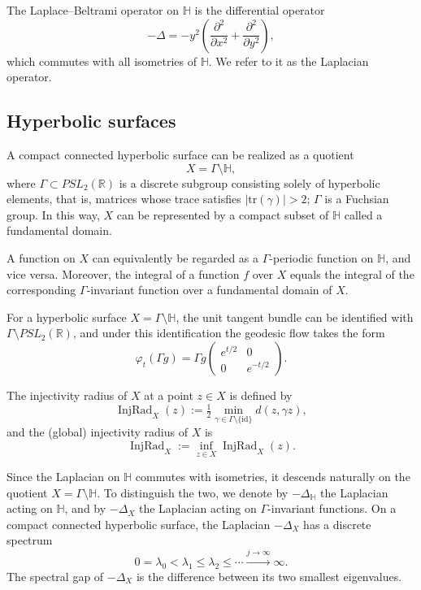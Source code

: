 \documentclass[11pt,twoside,reqno]{amsart} \usepackage{a4wide} \usepackage[T1]{fontenc} \usepackage[utf8]{inputenc} \usepackage{soul}  \usepackage{amsmath} \usepackage{amsfonts} \usepackage{amssymb} \usepackage{mathtools} \usepackage{amsthm} \usepackage{xcolor} \usepackage{graphicx} \usepackage{hyperref} \usepackage{standalone} \usepackage{esint} \usepackage{comment} \usepackage[left=2.3cm,top=3cm,right=2.3cm]{geometry} \usepackage{bm} \usepackage{svg} \usepackage{float} \numberwithin{equation}{section} \theoremstyle{plain} \newtheorem{thm}{Theorem}[section] \newtheorem{theorem}[thm]{Theorem} \newtheorem*{theorem*}{Theorem}\newtheorem{conj}[thm]{Conjecture} \newtheorem{lemma}[thm]{Lemma} \newtheorem{prop}[thm]{Proposition} \newtheorem{proposition}[thm]{Proposition} \newtheorem{cor}[thm]{Corollary} \newtheorem{question}[thm]{Question} \newtheorem{corollary}[thm]{Corollary} \newtheorem{assumption}[thm]{Assumption} \theoremstyle{definition} \newtheorem{defn}[thm]{Definition} \newtheorem{choice}[thm]{Choice} \newtheorem{definition}[thm]{Definition} \newtheorem{ex}[thm]{Example} \newtheorem{notation}[thm]{Notation} \newtheorem*{ack}{Acknowledgements} \theoremstyle{remark} \newtheorem{remark}[thm]{Remark} \newtheorem{bigremark}[thm]{Remark} \usepackage{xcolor} \newcommand{\red}[1]{ {\color{Red}#1} } \newcommand{\blue}[1]{ {\color{Blue}#1} } \author{Kai Hippi} \address{Aalto University, Espoo, Finland} \email{kai.hippi@aalto.fi}
\begin{document}
The Laplace--Beltrami operator on \( \mathbb{H} \) is the differential operator
\[
    -\Delta = -y^{2}\left( \frac{\partial^{2}}{\partial x^{2}} + \frac{\partial^{2}}{\partial y^{2}} \right),
\]
which commutes with all isometries of \( \mathbb{H} \). We refer to it as the Laplacian operator.

\subsection{Hyperbolic surfaces}

A compact connected hyperbolic surface can be realized as a quotient
\[
    X = \Gamma \setminus \mathbb{H},
\]
where \( \Gamma \subset PSL_{2}(\mathbb{R}) \) is a discrete subgroup consisting solely of hyperbolic elements, that is, matrices whose trace satisfies \( |\mathrm{tr}(\gamma)| > 2 \); $ \Gamma $ is a Fuchsian group. In this way, \( X \) can be represented by a compact subset of $ \mathbb{H} $ called a fundamental domain.

A function on \( X \) can equivalently be regarded as a \( \Gamma \)-periodic function on \( \mathbb{H} \), and vice versa. Moreover, the integral of a function \( f \) over \( X \) equals the integral of the corresponding \( \Gamma \)-invariant function over a fundamental domain of $ X $.

For a hyperbolic surface \( X = \Gamma \setminus \mathbb{H} \), the unit tangent bundle can be identified with \( \Gamma \setminus PSL_{2}(\mathbb{R}) \), and under this identification the geodesic flow takes the form
\[
    \varphi_{t}(\Gamma g) = \Gamma g
    \begin{pmatrix} e^{t/2} & 0 \\ 0 & e^{-t/2} \end{pmatrix}.
\]

The injectivity radius of \( X \) at a point \( z \in X \) is defined by
\[
    \operatorname{InjRad}_{X}(z)
    := \tfrac{1}{2} \min_{\gamma \in \Gamma \setminus \{\mathrm{id}\}} d(z, \gamma z),
\]
and the (global) injectivity radius of \( X \) is
\[
    \operatorname{InjRad}_{X}
    := \inf_{z \in X} \operatorname{InjRad}_{X}(z).
\]

Since the Laplacian on \( \mathbb{H} \) commutes with isometries, it descends naturally on the quotient \( X = \Gamma \setminus \mathbb{H} \). To distinguish the two, we denote by \( -\Delta_{\mathbb{H}} \) the Laplacian acting on \( \mathbb{H} \), and by \( -\Delta_{X} \) the Laplacian acting on \( \Gamma \)-invariant functions. On a compact connected hyperbolic surface, the Laplacian \( -\Delta_{X} \) has a discrete spectrum
\[
    0 = \lambda_{0} < \lambda_{1} \le \lambda_{2} \le \dotsb \xrightarrow{j \to \infty} \infty.
\]
The spectral gap of $ -\Delta_{X} $ is the difference between its two smallest eigenvalues.
\end{document}
